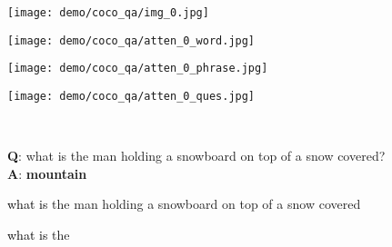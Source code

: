 \documentclass{article}
\def \fsize {1pt}
\begin{document}
\begin{figure}[tb]
\center
\begin{minipage}{0.22\linewidth}
\texttt{[image: demo/coco\_qa/img\_0.jpg]}
\end{minipage}
\begin{minipage}{0.22\linewidth}
\texttt{[image: demo/coco\_qa/atten\_0\_word.jpg]}
\end{minipage}
\begin{minipage}{0.22\linewidth}
\texttt{[image: demo/coco\_qa/atten\_0\_phrase.jpg]}
\end{minipage}
\begin{minipage}{0.22\linewidth}
\texttt{[image: demo/coco\_qa/atten\_0\_ques.jpg]}
\end{minipage}
\\
\begin{minipage}{0.22\linewidth}
\begin{center}
\tiny{\textbf{Q}: what is the man holding a snowboard on top of a snow covered? \textbf{A}: \textbf{mountain}}
\end{center}
\end{minipage}
\begin{minipage}{0.22\linewidth}
\begin{center}
\tiny{\textcolor{black}{
\setlength{\fboxsep}{\fsize}
\textcolor[rgb]{0.0000,0.4098,1.0000}{what}
\textcolor[rgb]{0.0000,0.4098,1.0000}{is}}
\textcolor[rgb]{0.0000,0.3941,1.0000}{the}
\textcolor[rgb]{0.0000,0.3627,1.0000}{man}
\textcolor[rgb]{0.0000,0.3471,1.0000}{holding}
\textcolor[rgb]{0.0000,0.3471,1.0000}{a}
\textcolor[rgb]{0.3004,1.0000,0.6673}{snowboard}
\textcolor[rgb]{0.0000,0.3000,1.0000}{on}
\textcolor[rgb]{0.0348,0.9431,0.9330}{top}
\textcolor[rgb]{0.0000,0.4569,1.0000}{of}
\textcolor[rgb]{0.0000,0.3471,1.0000}{a}
\textcolor[rgb]{0.0000,0.8176,1.0000}{snow}
\textcolor[rgb]{0.0348,0.9431,0.9330}{covered}
}
\end{center}
\end{minipage}
\begin{minipage}{0.22\linewidth}
\begin{center}
\tiny{\textcolor{black}{
\setlength{\fboxsep}{\fsize}
\textcolor[rgb]{0.0000,0.3627,1.0000}{what}
\textcolor[rgb]{0.0000,0.3784,1.0000}{is}}
\textcolor[rgb]{0.0000,0.3627,1.0000}{the}
}
\end{center}
\end{minipage}
\end{figure}
\end{document}
